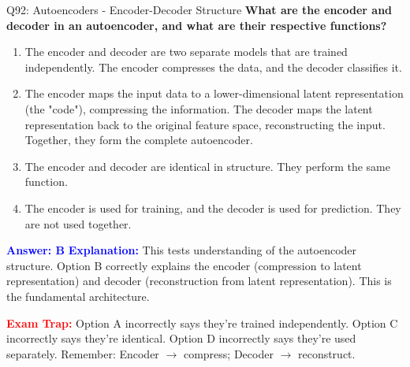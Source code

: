 \documentclass[8pt]{beamer}
\begin{document}
	\begin{frame}{Q92: Autoencoders - Encoder-Decoder Structure}
		\fontsize{6.5}{7.5}\selectfont
		\textbf{What are the encoder and decoder in an autoencoder, and what are their respective functions?}
		
		\begin{enumerate}
			\item The encoder and decoder are two separate models that are trained independently. The encoder compresses the data, and the decoder classifies it.
			\item The encoder maps the input data to a lower-dimensional latent representation (the "code"), compressing the information. The decoder maps the latent representation back to the original feature space, reconstructing the input. Together, they form the complete autoencoder.
			\item The encoder and decoder are identical in structure. They perform the same function.
			\item The encoder is used for training, and the decoder is used for prediction. They are not used together.
		\end{enumerate}
		
		\vspace{0.1cm}
		\textcolor{blue}{\textbf{Answer: B}}
		\vspace{0.1cm}
		\textcolor{blue}{\textbf{Explanation:}} This tests understanding of the autoencoder structure. Option B correctly explains the encoder (compression to latent representation) and decoder (reconstruction from latent representation). This is the fundamental architecture.
		
		\textcolor{red}{\textbf{Exam Trap:}} Option A incorrectly says they're trained independently. Option C incorrectly says they're identical. Option D incorrectly says they're used separately. Remember: Encoder $\rightarrow$ compress; Decoder $\rightarrow$ reconstruct.
	\end{frame}
	
\end{document}
